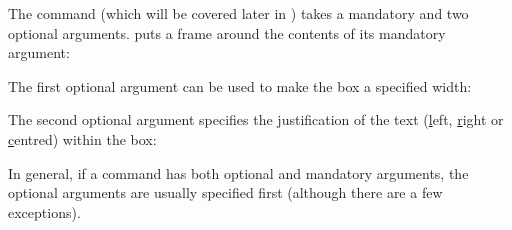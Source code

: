 The command  (which will be covered later in
) takes a
\gls{mandatory} and two optional arguments.
 puts a frame around the contents of its
mandatory argument:
\begin{codeS}
\end{codeS}%
\begin{resultS}
\end{resultS}
The first optional argument can be used to make the box a specified
width:
\begin{codeS}
\oarg{4cm}
\end{codeS}%
\begin{resultS}
\end{resultS}
The second optional argument specifies the
justification of the text (\underline{l}eft, \underline{r}ight or
\underline{c}entred) within the box:
\begin{codeS}
\oarg{4cm}
\end{codeS}%
\begin{resultS}
\end{resultS}
\glspar
In general, if a command has both optional and mandatory arguments,
the optional arguments are usually specified first (although there
are a few exceptions).
